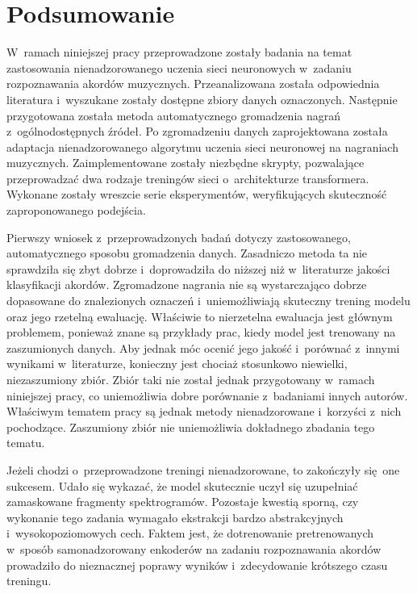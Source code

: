 \chapter{Podsumowanie} \label{chapter:summary}

W~ramach niniejszej pracy przeprowadzone zostały badania na temat zastosowania nienadzorowanego uczenia sieci neuronowych w~zadaniu rozpoznawania akordów muzycznych. Przeanalizowana została odpowiednia literatura i~wyszukane zostały dostępne zbiory danych oznaczonych. Następnie przygotowana została metoda automatycznego gromadzenia nagrań z~ogólnodostępnych źródeł. Po zgromadzeniu danych zaprojektowana została adaptacja nienadzorowanego algorytmu uczenia sieci neuronowej na nagraniach muzycznych. Zaimplementowane zostały niezbędne skrypty, pozwalające przeprowadzać dwa rodzaje treningów sieci o~architekturze transformera. Wykonane zostały wreszcie serie eksperymentów, weryfikujących skuteczność zaproponowanego podejścia.

Pierwszy wniosek z~przeprowadzonych badań dotyczy zastosowanego, automatycznego sposobu gromadzenia danych. Zasadniczo metoda ta nie sprawdziła się zbyt dobrze i~doprowadziła do niższej niż w~literaturze jakości klasyfikacji akordów. Zgromadzone nagrania nie są wystarczająco dobrze dopasowane do znalezionych oznaczeń i~uniemożliwiają skuteczny trening modelu oraz jego rzetelną ewaluację. Właściwie to nierzetelna ewaluacja jest głównym problemem, ponieważ znane są przykłady prac, kiedy model jest trenowany na zaszumionych danych. Aby jednak móc ocenić jego jakość i~porównać z~innymi wynikami w~literaturze, konieczny jest chociaż stosunkowo niewielki, niezaszumiony zbiór. Zbiór taki nie został jednak przygotowany w~ramach niniejszej pracy, co uniemożliwia dobre porównanie z~badaniami innych autorów. Właściwym tematem pracy są jednak metody nienadzorowane i~korzyści z~nich pochodzące. Zaszumiony zbiór nie uniemożliwia dokładnego zbadania tego tematu.

Jeżeli chodzi o~przeprowadzone treningi nienadzorowane, to zakończyły się one sukcesem. Udało się wykazać, że model skutecznie uczył się uzupełniać zamaskowane fragmenty spektrogramów. Pozostaje kwestią sporną, czy wykonanie tego zadania wymagało ekstrakcji bardzo abstrakcyjnych i~wysokopoziomowych cech. Faktem jest, że dotrenowanie pretrenowanych w~sposób samonadzorowany enkoderów na zadaniu rozpoznawania akordów prowadziło do nieznacznej poprawy wyników i~zdecydowanie krótszego czasu treningu.

